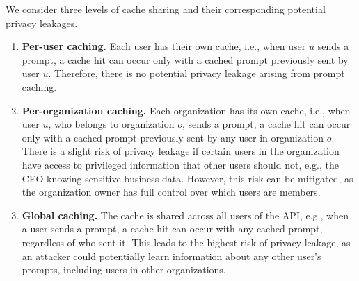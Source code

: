We consider three levels of cache sharing and their corresponding potential privacy leakages.
\begin{enumerate}
    \item \textbf{Per-user caching.} Each user has their own cache, i.e., when user $u$ sends a prompt, a cache hit can occur only with a cached prompt previously sent by user $u$. Therefore, there is no potential privacy leakage arising from prompt caching.
    \item \textbf{Per-organization caching.} Each organization has its own cache, i.e., when user $u$, who belongs to organization $o$, sends a prompt, a cache hit can occur only with a cached prompt previously sent by any user in organization $o$. There is a slight risk of privacy leakage if certain users in the organization have access to privileged information that other users should not, e.g., the CEO knowing sensitive business data. However, this risk can be mitigated, as the organization owner has full control over which users are members.
    \item \textbf{Global caching.} The cache is shared across all users of the API, e.g., when a user sends a prompt, a cache hit can occur with any cached prompt, regardless of who sent it. This leads to the highest risk of privacy leakage, as an attacker could potentially learn information about any other user's prompts, including users in other organizations.
\end{enumerate}



